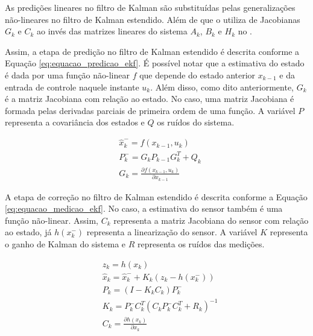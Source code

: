 \documentclass[acronym, symbols, table, deposito]{fei}
\begin{document}
			As predições lineares no filtro de Kalman são substituídas pelas generalizações não-lineares no filtro de Kalman estendido. Além de que o  utiliza de Jacobianas $G_k$ e $C_k$ ao invés das matrizes lineares do sistema $A_k$, $B_k$ e $H_k$ no .
			
			Assim, a etapa de predição no filtro de Kalman estendido é descrita conforme a Equação \eqref{eq:equacao_predicao_ekf}. É possível notar que a estimativa do estado é dada por uma função não-linear $f$ que depende do estado anterior $x_{k-1}$ e da entrada de controle naquele instante $u_{k}$. Além disso, como dito anteriormente, $G_{k}$ é a matriz Jacobiana com relação ao estado. No caso, uma matriz Jacobiana é formada pelas derivadas parciais de primeira ordem de uma função. A variável $P$ representa a covariância dos estados e $Q$ os ruídos do sistema.
			
			\begin{equation} \label{eq:equacao_predicao_ekf}
				\begin{split}
					&\hat{x}_{k}^{-} = f(x_{k-1}, u_{k}) \\
					&P_{k}^{-} = G_{k}P_{k-1}G_{k}^{T} + Q_{k} \\
					&G_{k} = \frac{\partial f(x_{k-1}, u_{k})}{\partial x_{k-1}} 
				\end{split}
			\end{equation}
			
			A etapa de correção no filtro de Kalman estendido é descrita conforme a Equação \eqref{eq:equacao_medicao_ekf}. No caso, a estimativa do sensor também é uma função não-linear. Assim, $C_k$ representa a matriz Jacobiana do sensor com relação ao estado, já $h(x_{k}^{-})$ representa a linearização do sensor. A variável $K$ representa o ganho de Kalman do sistema e $R$ representa os ruídos das medições.
			
			\begin{equation} \label{eq:equacao_medicao_ekf}
				\begin{split}
					&z_k = h(x_{k}) \\
					&\hat{x}_{k} = \hat{x}_{k}^{-} + K_{k}(z_k - h(x_{k}^{-})) \\
					&P_{k} = (I - K_{k}C_{k})P_{k}^{-} \\
					&K_k = P_{k}^{-}C_{k}^T(C_{k}P_{k}^{-}C_{k}^T + R_k)^{-1} \\
					&C_k = \frac{\partial h(x_k)}{\partial x_{k}}
				\end{split}
			\end{equation}
			
\end{document}
